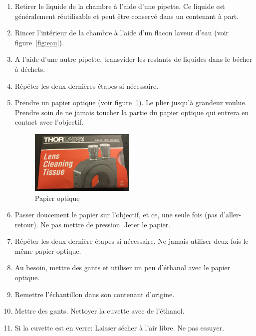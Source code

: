 \begin{enumerate}
    \item Retirer le liquide de la chambre à l'aide d'une pipette. Ce liquide est généralement réutilisable et peut être conservé dans un contenant à part.
    \item Rincer l'intérieur de la chambre à l'aide d'un flacon laveur d'eau (voir figure~\ref{fig:eau}).
    \item A l'aide d'une autre pipette, transvider les restants de liquides dans le bécher à déchets.
    \item Répéter les deux dernières étapes si nécessaire.
    \item Prendre un papier optique (voir figure~\ref{fig:papier}). Le plier jusqu'à grandeur voulue. Prendre soin de ne jamais toucher la partie du papier optique qui entrera en contact avec l'objectif. 
        \begin{figure}[H]
        \centering
        \includegraphics[width=5cm]{papier.jpg}
        \caption{Papier optique}
        \label{fig:papier}
        \end{figure}
    \item Passer doucement le papier sur l'objectif, et ce, une seule fois (pas d'aller-retour). Ne pas mettre de pression. Jeter le papier.
    \item Répéter les deux dernière étapes si nécessaire. Ne jamais utiliser deux fois le même papier optique.
    \item Au besoin, mettre des gants et utiliser un peu d'éthanol avec le papier optique.
    \item Remettre l'échantillon dans son contenant d'origine.
    \item Mettre des gants. Nettoyer la cuvette avec de l'éthanol. \item Si la cuvette est en verre: Laisser sécher à l'air libre. Ne pas essuyer.
\end{enumerate}